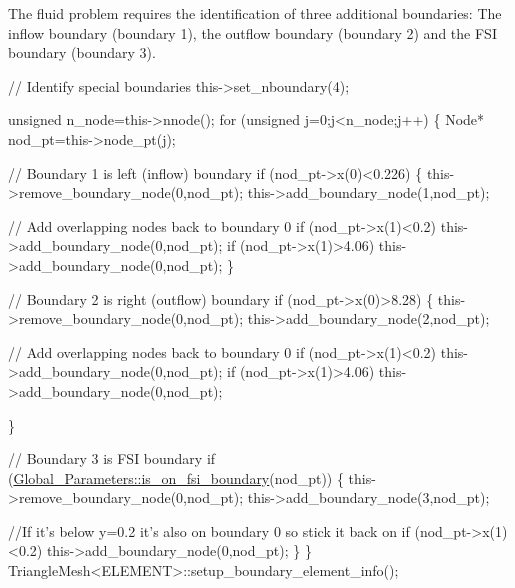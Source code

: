 The fluid problem requires the identification of three additional boundaries\+: The inflow boundary (boundary 1), the outflow boundary (boundary 2) and the F\+SI boundary (boundary 3).


\begin{DoxyCodeInclude}

   \textcolor{comment}{// Identify special boundaries}
   this->set\_nboundary(4);

   \textcolor{keywordtype}{unsigned} n\_node=this->nnode();
   \textcolor{keywordflow}{for} (\textcolor{keywordtype}{unsigned} j=0;j<n\_node;j++)
    \{
     Node* nod\_pt=this->node\_pt(j);

     \textcolor{comment}{// Boundary 1 is left (inflow) boundary}
     \textcolor{keywordflow}{if} (nod\_pt->x(0)<0.226)
      \{
       this->remove\_boundary\_node(0,nod\_pt);
       this->add\_boundary\_node(1,nod\_pt);

       \textcolor{comment}{// Add overlapping nodes back to boundary 0}
       \textcolor{keywordflow}{if} (nod\_pt->x(1)<0.2) this->add\_boundary\_node(0,nod\_pt);
       \textcolor{keywordflow}{if} (nod\_pt->x(1)>4.06) this->add\_boundary\_node(0,nod\_pt);
      \}

     \textcolor{comment}{// Boundary 2 is right (outflow) boundary}
     \textcolor{keywordflow}{if} (nod\_pt->x(0)>8.28)
      \{
       this->remove\_boundary\_node(0,nod\_pt);
       this->add\_boundary\_node(2,nod\_pt);

       \textcolor{comment}{// Add overlapping nodes back to boundary 0}
       \textcolor{keywordflow}{if} (nod\_pt->x(1)<0.2) this->add\_boundary\_node(0,nod\_pt);
       \textcolor{keywordflow}{if} (nod\_pt->x(1)>4.06) this->add\_boundary\_node(0,nod\_pt);

      \}

     \textcolor{comment}{// Boundary 3 is FSI boundary}
     \textcolor{keywordflow}{if} (\hyperlink{namespaceGlobal__Parameters_a655abf819eb3045dac883f2b7073ba22}{Global\_Parameters::is\_on\_fsi\_boundary}(nod\_pt))
      \{
       this->remove\_boundary\_node(0,nod\_pt);
       this->add\_boundary\_node(3,nod\_pt);
       
       \textcolor{comment}{//If it's below y=0.2 it's also on boundary 0 so stick it back on}
       \textcolor{keywordflow}{if} (nod\_pt->x(1)<0.2) this->add\_boundary\_node(0,nod\_pt);
      \}
    \}
   TriangleMesh<ELEMENT>::setup\_boundary\_element\_info();

\end{DoxyCodeInclude}


